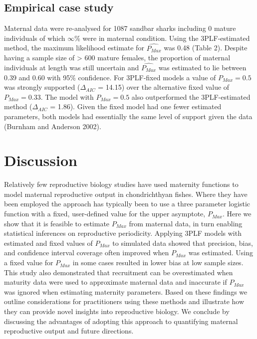 \documentclass[
]{article}
\begin{document}
\subsection{Empirical case study}\label{empirical-case-study-1}

Maternal data were re-analysed for 1087 sandbar sharks including 0 mature individuals of which \ensuremath{\infty{}}\% were in maternal condition. Using the 3PLF-estimated method, the maximum likelihood estimate for \(\hat{P_{Max}}\) was 0.48 (Table 2). Despite having a sample size of \textgreater{} 600 mature females, the proportion of maternal individuals at length was still uncertain and \(\hat{P_{Max}}\) was estimated to lie between 0.39 and 0.60 with 95\% confidence. For 3PLF-fixed models a value of \(P_{Max} = 0.5\) was strongly supported (\(\Delta_{AIC}\) = 14.15) over the alternative fixed value of \(P_{Max} = 0.33\). The model with \(P_{Max} = 0.5\) also outperformed the 3PLF-estimated method (\(\Delta_{AIC}\) = 1.86). Given the fixed model had one fewer estimated parameters, both models had essentially the same level of support given the data (Burnham and Anderson 2002).

\section{Discussion}\label{discussion}

Relatively few reproductive biology studies have used maternity functions to model maternal reproductive output in chondrichthyan fishes. Where they have been employed the approach has typically been to use a three parameter logistic function with a fixed, user-defined value for the upper asymptote, \(P_{Max}\). Here we show that it is feasible to estimate \(P_{Max}\) from maternal data, in turn enabling statistical inferences on reproductive periodicity. Applying 3PLF models with estimated and fixed values of \(P_{Max}\) to simulated data showed that precision, bias, and confidence interval coverage often improved when \(P_{Max}\) was estimated. Using a fixed value for \(P_{Max}\) in some cases resulted in lower bias at low sample sizes. This study also demonstrated that recruitment can be overestimated when maturity data were used to approximate maternal data and inaccurate if \(P_{Max}\) was ignored when estimating maternity parameters. Based on these findings we outline considerations for practitioners using these methods and illustrate how they can provide novel insights into reproductive biology. We conclude by discussing the advantages of adopting this approach to quantifying maternal reproductive output and future directions.
\end{document}
